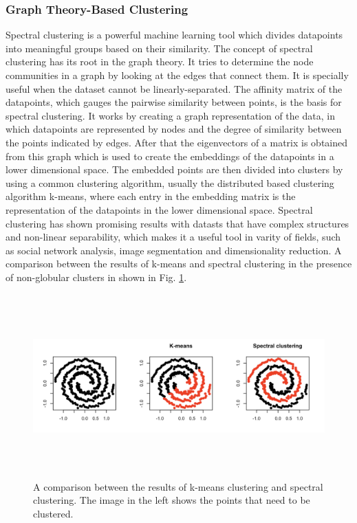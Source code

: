 \subsubsection{Graph Theory-Based Clustering}
Spectral clustering is a powerful machine learning tool which divides datapoints into meaningful groups based on their similarity. The concept of spectral clustering has its root in the graph theory. It tries to determine the node communities in a graph by looking at the edges that connect them. It is specially useful when the dataset cannot be linearly-separated. The affinity matrix of the datapoints, which gauges the pairwise similarity between points, is the basis for spectral clustering. It works by creating a graph representation of the data, in which datapoints are represented by nodes and the degree of similarity between the points indicated by edges. After that the eigenvectors of a matrix is obtained from this graph which is used to create the embeddings of the datapoints in a lower dimensional space.  The embedded points are then divided into clusters by using a common clustering algorithm, usually the distributed based clustering algorithm k-means, where each entry in the embedding matrix is the representation of the datapoints in the lower dimensional space. Spectral clustering has shown promising results with datasts that have complex structures and non-linear separability, which makes it a useful tool in varity of fields, such as social network analysis, image segmentation and dimensionality reduction\cite{von2007tutorial}. A comparison between the results of k-means and spectral clustering in the presence of non-globular clusters in shown in Fig. \ref{fig:spectral}.\cite{demmel1999cs}
\begin{figure}[t]
  \centering
  \includegraphics[width=400pt,height=200pt]{pictures/spectral.PNG}
  \caption{A comparison between the results of k-means clustering and spectral clustering. The image in the left shows the points that need to be clustered.\cite{palmer2021spectral}}
  \label{fig:spectral}
\end{figure} 

